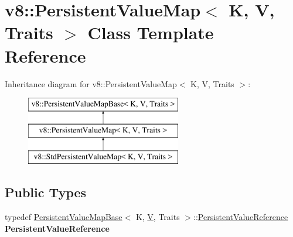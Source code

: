\hypertarget{classv8_1_1PersistentValueMap}{}\section{v8\+:\+:Persistent\+Value\+Map$<$ K, V, Traits $>$ Class Template Reference}
\label{classv8_1_1PersistentValueMap}
Inheritance diagram for v8\+:\+:Persistent\+Value\+Map$<$ K, V, Traits $>$\+:\begin{figure}[H]
\begin{center}
\leavevmode
\includegraphics[height=3.000000cm]{classv8_1_1PersistentValueMap}
\end{center}
\end{figure}
\subsection*{Public Types}
\begin{DoxyCompactItemize}
\item 
\mbox{\label{classv8_1_1PersistentValueMap_a81ed968e13bcef1cd97a09fd024f30f2}} 
typedef \mbox{\hyperlink{classv8_1_1PersistentValueMapBase}{Persistent\+Value\+Map\+Base}}$<$ K, \mbox{\hyperlink{classV}{V}}, Traits $>$\+::\mbox{\hyperlink{classv8_1_1PersistentValueMapBase_1_1PersistentValueReference}{Persistent\+Value\+Reference}} {\bfseries Persistent\+Value\+Reference}
\end{DoxyCompactItemize}
